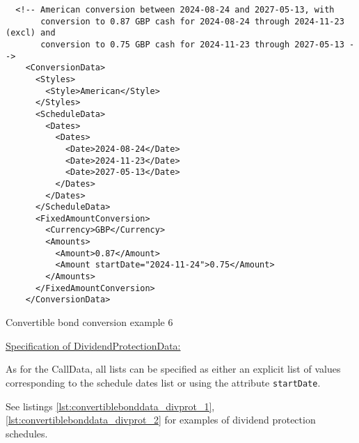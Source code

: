 \begin{listing}[H]
\begin{verbatim}
  <!-- American conversion between 2024-08-24 and 2027-05-13, with
       conversion to 0.87 GBP cash for 2024-08-24 through 2024-11-23 (excl) and
       conversion to 0.75 GBP cash for 2024-11-23 through 2027-05-13 -->
    <ConversionData>
      <Styles>
        <Style>American</Style>
      </Styles>
      <ScheduleData>
        <Dates>
          <Dates>
            <Date>2024-08-24</Date>
            <Date>2024-11-23</Date>
            <Date>2027-05-13</Date>
          </Dates>
        </Dates>
      </ScheduleData>
      <FixedAmountConversion>
        <Currency>GBP</Currency>
        <Amounts>
          <Amount>0.87</Amount>
          <Amount startDate="2024-11-24">0.75</Amount>
        </Amounts>
      </FixedAmountConversion>
    </ConversionData>
\end{verbatim}
\caption{Convertible bond conversion example 6}
\label{lst:convertiblebonddata_conversion_6}
\end{listing}

\underline{Specification of DividendProtectionData:}

As for the CallData, all lists can be specified as either an explicit list of values corresponding to the schedule dates
list or using the attribute \verb+startDate+.

See listings \ref{lst:convertiblebonddata_divprot_1}, \ref{lst:convertiblebonddata_divprot_2}
for examples of dividend protection schedules.

